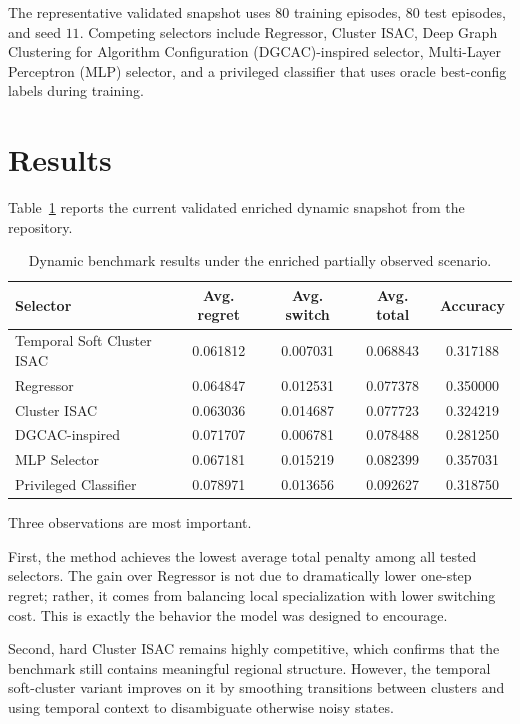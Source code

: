 \documentclass[conference]{IEEEtran}
\begin{document}
The representative validated snapshot uses $80$ training episodes, $80$ test episodes, and seed $11$. Competing selectors include Regressor, Cluster ISAC, Deep Graph Clustering for Algorithm Configuration (DGCAC)-inspired selector, Multi-Layer Perceptron (MLP) selector, and a privileged classifier that uses oracle best-config labels during training.

\section{Results}

Table~\ref{tab:dynamic-results} reports the current validated enriched dynamic snapshot from the repository.

\begin{table}[t]
\caption{Dynamic benchmark results under the enriched partially observed scenario.}
\label{tab:dynamic-results}
\centering
\begin{tabular}{lcccc}
\toprule
Selector & Avg. regret & Avg. switch & Avg. total & Accuracy \\
\midrule
Temporal Soft Cluster ISAC & 0.061812 & 0.007031 & 0.068843 & 0.317188 \\
Regressor & 0.064847 & 0.012531 & 0.077378 & 0.350000 \\
Cluster ISAC & 0.063036 & 0.014687 & 0.077723 & 0.324219 \\
DGCAC-inspired & 0.071707 & 0.006781 & 0.078488 & 0.281250 \\
MLP Selector & 0.067181 & 0.015219 & 0.082399 & 0.357031 \\
Privileged Classifier & 0.078971 & 0.013656 & 0.092627 & 0.318750 \\
\bottomrule
\end{tabular}
\end{table}

Three observations are most important.

First, the method achieves the lowest average total penalty among all tested selectors. The gain over Regressor is not due to dramatically lower one-step regret; rather, it comes from balancing local specialization with lower switching cost. This is exactly the behavior the model was designed to encourage.

Second, hard Cluster ISAC remains highly competitive, which confirms that the benchmark still contains meaningful regional structure. However, the temporal soft-cluster variant improves on it by smoothing transitions between clusters and using temporal context to disambiguate otherwise noisy states.
\end{document}
